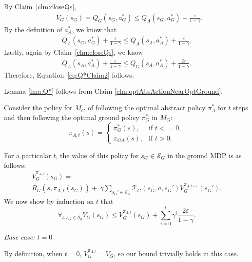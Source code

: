 By Claim~\ref{clm:closeQs},
\begin{align}
&V_G(s_G) = Q_G(s_G, a^*_G) \leq Q_A(s_G, a^*_G) + \frac{\varepsilon}{1-\gamma}.
\label{eq:Q*OptActionResult}
\end{align}
By the definition of $a^*_A$, we know that 
\begin{align}
Q_A(s_G, a^*_G) + \frac{\varepsilon}{1-\gamma} \leq Q_A(s_A, a^*_A) + \frac{\varepsilon}{1-\gamma}.
\end{align}
Lastly, again by Claim~\ref{clm:closeQs}, we know
\begin{align}
Q_A(s_A, a^*_A) + \frac{\varepsilon}{1-\gamma} \leq Q_G(s_A, a^*_A) + \frac{2\varepsilon}{1-\gamma}.
\end{align}
Therefore, Equation~\ref{eq:Q*Claim2} follows.

\begin{clm}
Lemma \ref{lma:Q*} follows from Claim \ref{clm:optAbsActionNearOptGround}.
\label{clm:lmaFromClm}
\end{clm}

Consider the policy for $M_G$ of following the optimal abstract policy $\pi^*_A$ for $t$ steps and then following the optimal ground policy $\pi^*_G$ in $M_G$:
\begin{equation}
\pi_{A,t}(s)=
\begin{cases}
\pi_G^*(s), &\text{if } t<=0,\\
\pi_{GA}(s), &\text{if } t > 0.
\end{cases}
\end{equation}

For a particular $t$, the value of this policy for $s_G \in \mathcal{S}_G$ in the ground \ac{MDP} is as follows:
\begin{multline*}
V_G^{\pi_{A,t}}(s_G) = \\
R_G(s, \pi_{A,t}(s_G)) +\ \gamma \sum_{{s_G}' \in \mathcal{S}_G}\mathcal{T}_G(s_G, a, {s_G}')V_G^{\pi_{A,t-1}}({s_G}').
\end{multline*}
We now show by induction on $t$ that
\begin{equation}
\forall_{t, s_G \in \mathcal{S}_g} V_G(s_G) \leq  V_G^{\pi_{A,t}}(s_G) + \sum_{i=0}^{t}\gamma^i \frac{2\varepsilon}{1-\gamma}.
\end{equation}

\textit{Base case: $t=0$}

By definition, when $t=0$, $V_G^{\pi_{A,t}} = V_G$, so our bound trivially holds in this case.

